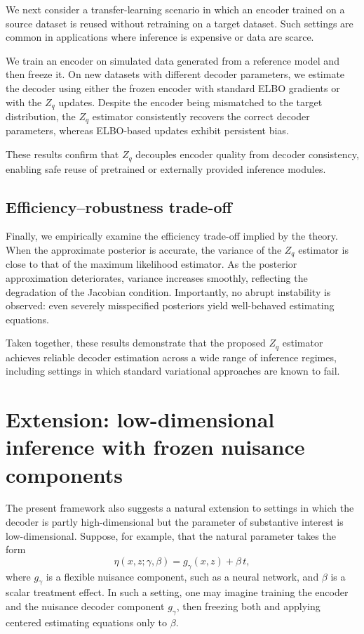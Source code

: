 \documentclass[twoside,11pt]{article}
\begin{document}
We next consider a transfer-learning scenario in which an encoder trained on a
source dataset is reused without retraining on a target dataset.  Such settings
are common in applications where inference is expensive or data are scarce.

We train an encoder on simulated data generated from a reference model and then
freeze it.  On new datasets with different decoder parameters, we estimate the
decoder using either the frozen encoder with standard ELBO gradients or with the
$Z_q$ updates.  Despite the encoder being mismatched to the target distribution,
the $Z_q$ estimator consistently recovers the correct decoder parameters, whereas
ELBO-based updates exhibit persistent bias.

These results confirm that $Z_q$ decouples encoder quality from decoder
consistency, enabling safe reuse of pretrained or externally provided inference
modules.

\subsection{Efficiency--robustness trade-off}

Finally, we empirically examine the efficiency trade-off implied by the theory.
When the approximate posterior is accurate, the variance of the $Z_q$ estimator is
close to that of the maximum likelihood estimator.  As the posterior approximation
deteriorates, variance increases smoothly, reflecting the degradation of the
Jacobian condition.  Importantly, no abrupt instability is observed: even severely
misspecified posteriors yield well-behaved estimating equations.

Taken together, these results demonstrate that the proposed $Z_q$ estimator
achieves reliable decoder estimation across a wide range of inference regimes,
including settings in which standard variational approaches are known to fail.

\fi  %



\section{Extension: low-dimensional inference with frozen nuisance components}

The present framework also suggests a natural extension to settings in which the decoder is partly high-dimensional but the parameter of substantive interest is low-dimensional. Suppose, for example, that the natural parameter takes the form
\[
\eta(x,z;\gamma,\beta)
=
g_\gamma(x,z)+\beta\,t,
\]
where \(g_\gamma\) is a flexible nuisance component, such as a neural network, and \(\beta\) is a scalar treatment effect. In such a setting, one may imagine training the encoder and the nuisance decoder component \(g_\gamma\), then freezing both and applying centered estimating equations only to \(\beta\).
\end{document}
